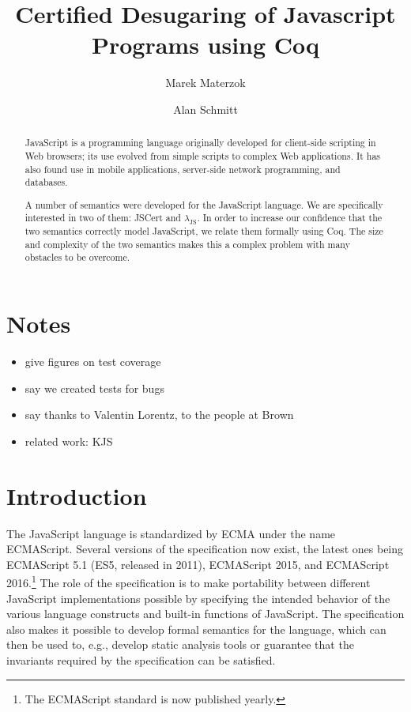 \documentclass{llncs}
\begin{document}
\title{Certified Desugaring of Javascript Programs using Coq}

\author{Marek Materzok \and Alan Schmitt}

\maketitle

\newcommand{\lambdajs}{$\lambda_\textrm{JS}$\xspace}

\begin{abstract}
JavaScript is a programming language originally developed for client-side
scripting in Web browsers; its use evolved from simple scripts to
complex Web applications. It has also found use in mobile applications,
server-side network programming, and databases.

A number of semantics were developed for the JavaScript language.
We are specifically interested in two of them: JSCert and \lambdajs.
In order to increase our confidence that the two semantics correctly
model JavaScript, we relate them formally using Coq. The size and complexity
of the two semantics makes this a complex problem with many obstacles
to be overcome.
\end{abstract}

\section{Notes}

\begin{itemize}
\item give figures on test coverage
\item say we created tests for bugs
\item say thanks to Valentin Lorentz, to the people at Brown
\item related work: KJS
\end{itemize}

\section{Introduction}

The JavaScript language is standardized by ECMA under the name ECMAScript.
Several versions of the specification now exist, the latest ones being
ECMAScript 5.1 (ES5, released in 2011), ECMAScript 2015, and ECMAScript
2016.\footnote{The ECMAScript standard is now published yearly.} The role of the
specification is to make portability between different JavaScript
implementations possible by specifying the intended behavior of the various
language constructs and built-in functions of JavaScript. The specification also
makes it possible to develop formal semantics for the language, which can then
be used to, e.g., develop static analysis tools or guarantee that the invariants
required by the specification can be satisfied.
\end{document}
